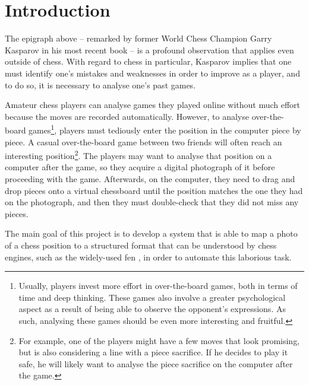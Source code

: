 \documentclass[../report.tex]{subfiles}
\begin{document}
\chapter{Introduction}
\label{chap:introduction}

The epigraph above -- remarked by former World Chess Champion Garry Kasparov in his most recent book \cite{kasparov2018} -- is a profound observation that applies even outside of chess.
With regard to chess in particular, Kasparov implies that one must identify one's mistakes and weaknesses in order to improve as a player, and to do so, it is necessary to analyse one's past games. 

Amateur chess players can analyse games they played online without much effort because the moves are recorded automatically.
However, to analyse over-the-board games\footnote{Usually, players invest more effort in over-the-board games, both in terms of time and deep thinking. These games also involve a greater psychological aspect as a result of being able to observe the opponent's expressions. As such, analysing these games should be even more interesting and fruitful.}, players must tediously enter the position in the computer piece by piece.
A casual over-the-board game between two friends will often reach an interesting position\footnote{For example, one of the players might have a few moves that look promising, but is also considering a line with a piece sacrifice. If he decides to play it safe, he will likely want to analyse the piece sacrifice on the computer after the game.}. 
The players may want to analyse that position on a computer after the game, so they acquire a digital photograph of it before proceeding with the game.
Afterwards, on the computer, they need to drag and drop pieces onto a virtual chessboard until the position matches the one they had on the photograph, and then they must double-check that they did not miss any pieces.

The main goal of this project is to develop a system that is able to map a photo of a chess position to a structured format that can be understood by chess engines, such as the widely-used \gls{fen} \cite{edwards1994}, in order to automate this laborious task.






\end{document}
